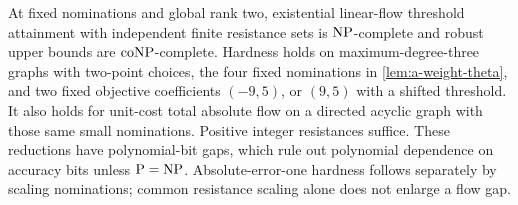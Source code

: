 \begin{theorem}
\label{thm:a-weight-flow-hard}
At fixed nominations and global rank two, existential linear-flow
threshold attainment with independent finite resistance sets is
$\mathrm{NP}$-complete and robust upper bounds are $\mathrm{coNP}$-complete.
Hardness holds on maximum-degree-three graphs with two-point choices,
the four fixed nominations in \cref{lem:a-weight-theta}, and two fixed
objective coefficients $(-9,5)$, or $(9,5)$ with a shifted threshold.
It also holds for unit-cost total absolute flow on a directed acyclic
graph with those same small nominations. Positive integer resistances
suffice. These reductions have polynomial-bit gaps, which rule out
polynomial dependence on accuracy bits unless $\mathrm P=\mathrm{NP}$.
Absolute-error-one hardness follows separately by scaling nominations;
common resistance scaling alone does not enlarge a flow gap.
\end{theorem}
